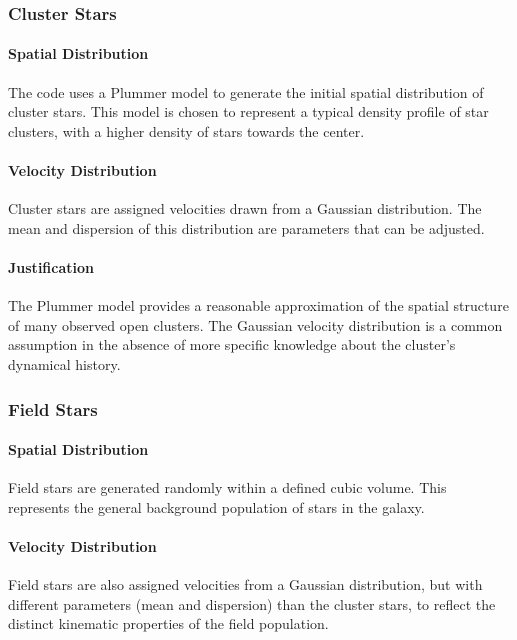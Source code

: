 \documentclass{article}
\begin{document}
	\subsubsection{Cluster Stars}
	
	\paragraph{Spatial Distribution}
	
	The code uses a Plummer model to generate the initial spatial distribution of cluster stars. This model is chosen to represent a typical density profile of star clusters, with a higher density of stars towards the center.
	
	\paragraph{Velocity Distribution}
	
	Cluster stars are assigned velocities drawn from a Gaussian distribution. The mean and dispersion of this distribution are parameters that can be adjusted. 
	
	\paragraph{Justification}
	
	The Plummer model provides a reasonable approximation of the spatial structure of many observed open clusters. The Gaussian velocity distribution is a common assumption in the absence of more specific knowledge about the cluster's dynamical history.
	
	\subsubsection{Field Stars}
	
	\paragraph{Spatial Distribution}
	
	Field stars are generated randomly within a defined cubic volume. This represents the general background population of stars in the galaxy.
	
	\paragraph{Velocity Distribution}
	
	Field stars are also assigned velocities from a Gaussian distribution, but with different parameters (mean and dispersion) than the cluster stars, to reflect the distinct kinematic properties of the field population.
	
\end{document}
